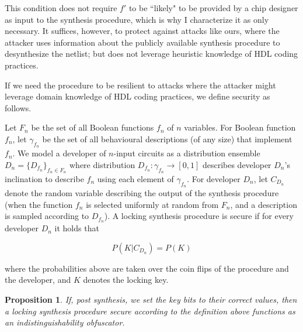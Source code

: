 \documentclass[conference,compsoc]{IEEEtran}
\newtheorem{proposition}[theorem]{Proposition}
\begin{document}
This condition does not require $f'$ to be ``likely" to be provided by a chip designer as input to the synthesis procedure, which is why I characterize it as only necessary. It suffices, however, to protect against attacks like ours, where the attacker uses information about the publicly available synthesis procedure to desynthesize the netlist; but does not leverage heuristic knowledge of HDL coding practices.

If we need the procedure to be resilient to attacks where the attacker might leverage domain knowledge of HDL coding practices, we define security as follows.

Let $F_n$ be the set of all Boolean functions $f_n$ of $n$ variables. For Boolean function $f_n$, let $\gamma_{f_n}$ be the set of all behavioural descriptions (of any size) that implement $f_n$. We model a developer of $n$-input circuits as a distribution ensemble $D_n=\{D_{f_n}\}_{f_n\in F_n}$ where distribution $D_{f_n}:\gamma_{f_n}\rightarrow [0,1]$ describes developer $D_n$'s inclination to describe $f_n$ using each element of $\gamma_{f_n}$. For developer $D_n$, let $C_{D_n}$ denote the random variable describing the output of the synthesis procedure (when the function $f_n$ is selected uniformly at random from $F_n$, and a description is sampled according to $D_{f_n}$). A locking synthesis procedure is secure if for every developer $D_n$ it holds that

$$ P(K|C_{D_n})=P(K) $$

where the probabilities above are taken over the coin flips of the procedure and the developer, and $K$ denotes the locking key.


\begin{proposition}
If, post synthesis, we set the key bits to their correct values, then a locking synthesis procedure secure according to the definition above functions as an indistinguishability obfuscator.
\end{proposition}
\end{document}
